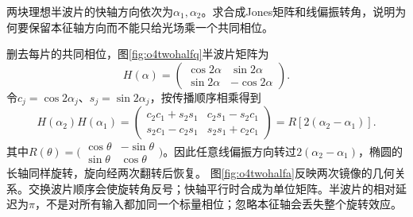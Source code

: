 \begin{exercise}\label{ex:o4twohalf}
两块理想半波片的快轴方向依次为$\alpha_1,\alpha_2$。求合成Jones矩阵和线偏振转角，说明为何要保留本征轴方向而不能只给光场乘一个共同相位。
\end{exercise}
\begin{solution}
删去每片的共同相位，图\ref{fig:o4twohalfq}半波片矩阵为
\[
 H(\alpha)=\begin{pmatrix}\cos2\alpha&\sin2\alpha\\
 \sin2\alpha&-\cos2\alpha\end{pmatrix}.
\]
令$c_j=\cos2\alpha_j$、$s_j=\sin2\alpha_j$，按传播顺序相乘得到
\[
 H(\alpha_2)H(\alpha_1)=
 \begin{pmatrix}c_2c_1+s_2s_1&c_2s_1-s_2c_1\\
 s_2c_1-c_2s_1&s_2s_1+c_2c_1\end{pmatrix}
 =R[2(\alpha_2-\alpha_1)].
\]
其中$R(\theta)=\bigl(\begin{smallmatrix}\cos\theta&-\sin\theta\\\sin\theta&\cos\theta\end{smallmatrix}\bigr)$。因此任意线偏振方向转过$2(\alpha_2-\alpha_1)$，椭圆的长轴同样旋转，旋向经两次翻转后恢复。
图\ref{fig:o4twohalfa}反映两次镜像的几何关系。交换波片顺序会使旋转角反号；快轴平行时合成为单位矩阵。半波片的相对延迟为$\pi$，不是对所有输入都加同一个标量相位；忽略本征轴会丢失整个旋转效应。
\end{solution}

